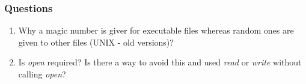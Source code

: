 \begin{frame}
    \frametitle{Questions}
    \begin{enumerate}
      \item Why a magic number is giver for executable files whereas random ones are given to other files (UNIX - old versions)?
      \item Is \emph{open} required? Is there a way to avoid this and used \emph{read} or \emph{write} without calling \emph{open}?
    \end{enumerate}
\end{frame}

